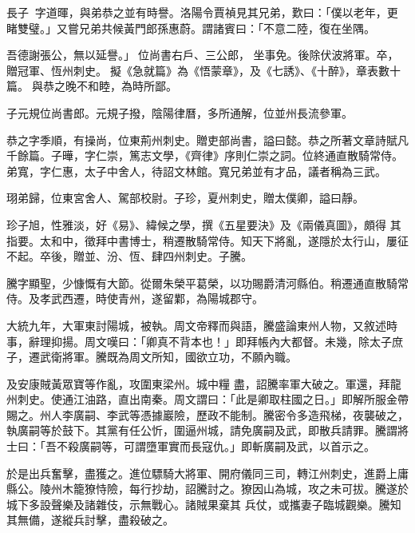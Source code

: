 \begin{pinyinscope}
 長子，字道暉，與弟恭之並有時譽。洛陽令賈禎見其兄弟，歎曰：「僕以老年，更睹雙璧。」又嘗兄弟共候黃門郎孫惠蔚。謂諸賓曰：「不意二陸，復在坐隅。



 吾德謝張公，無以延譽。」位尚書右戶、三公郎，
 坐事免。後除伏波將軍。卒，贈冠軍、恆州刺史。擬《急就篇》為《悟蒙章》，及《七誘》、《十醉》，章表數十篇。與恭之晚不和睦，為時所鄙。



 子元規位尚書郎。元規子撥，陰陽律曆，多所通解，位並州長流參軍。



 恭之字季順，有操尚，位東荊州刺史。贈吏部尚書，謚曰懿。恭之所著文章詩賦凡千餘篇。子曄，字仁崇，篤志文學，《齊律》序則仁崇之詞。位終通直散騎常侍。弟寬，字仁惠，太子中舍人，待詔文林館。寬兄弟並有才品，議者稱為三武。



 珝弟歸，位東宮舍人、駕部校尉。子珍，夏州刺史，贈太僕卿，謚曰靜。



 珍子旭，性雅淡，好《易》、緯候之學，撰《五星要決》及《兩儀真圖》，頗得
 其指要。太和中，徵拜中書博士，稍遷散騎常侍。知天下將亂，遂隱於太行山，屢征不起。卒後，贈並、汾、恆、肆四州刺史。子騰。



 騰字顯聖，少慷慨有大節。從爾朱榮平葛榮，以功賜爵清河縣伯。稍遷通直散騎常侍。及孝武西遷，時使青州，遂留鄴，為陽城郡守。



 大統九年，大軍東討陽城，被執。周文帝釋而與語，騰盛論東州人物，又敘述時事，辭理抑揚。周文嘆曰：「卿真不背本也！」即拜帳內大都督。未幾，除太子庶子，遷武衛將軍。騰既為周文所知，國欲立功，不願內職。



 及安康賊黃眾寶等作亂，攻圍東梁州。城中糧
 盡，詔騰率軍大破之。軍還，拜龍州刺史。使通江油路，直出南秦。周文謂曰：「此是卿取柱國之日。」即解所服金帶賜之。州人李廣嗣、李武等憑據巖險，歷政不能制。騰密令多造飛梯，夜襲破之，執廣嗣等於鼓下。其黨有任公忻，圍逼州城，請免廣嗣及武，即散兵請罪。騰謂將士曰：「吾不殺廣嗣等，可謂墮軍實而長寇仇。」即斬廣嗣及武，以首示之。



 於是出兵奮擊，盡獲之。進位驃騎大將軍、開府儀同三司，轉江州刺史，進爵上庸縣公。陵州木籠獠恃險，每行抄劫，詔騰討之。獠因山為城，攻之未可拔。騰遂於城下多設聲樂及諸雜伎，示無戰心。諸賊果棄其
 兵仗，或攜妻子臨城觀樂。騰知其無備，遂縱兵討擊，盡殺破之。




\end{pinyinscope}
